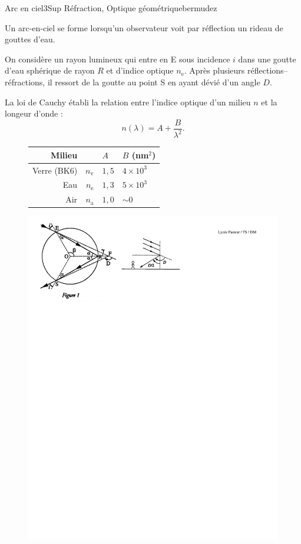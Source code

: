 \begin{exercise}{Arc en ciel}{3}{Sup}
{Réfraction, Optique géométrique}{bermudez}

Un arc-en-ciel se forme lorsqu'un observateur voit par réflection un rideau de gouttes d'eau.

On considère un rayon lumineux qui entre en E sous incidence $i$ dans une goutte d'eau sphérique de rayon $R$ et d'indice optique $n_\text{e}$. Après plusieurs réflections--réfractions, il ressort de la goutte au point S en ayant dévié d'un angle $D$.

La loi de Cauchy établi la relation entre l'indice optique d'un milieu $n$ et la longeur d'onde :
$$n(\lambda) = A + \dfrac{B}{\lambda^2}.$$

\begin{figure}[H]
\centering
\begin{tabular}{rr|ll}
    Milieu & & $A$ & $B$ (nm$^2$)  \\ \hline
    Verre (BK6) & $n_\text{v}$ & $1,5$ & $4\times 10^{3}$ \\
    Eau & $n_\text{e}$ & $1,3$ & $5\times 10^{3}$ \\
    Air & $n_\text{a}$ & $1,0$ & $\sim 0$ \\ \hline
\end{tabular}

\includegraphics[width=\linewidth]{optique/refraction/arc-en-ciel.pdf}
\end{figure}


\end{exercise}
